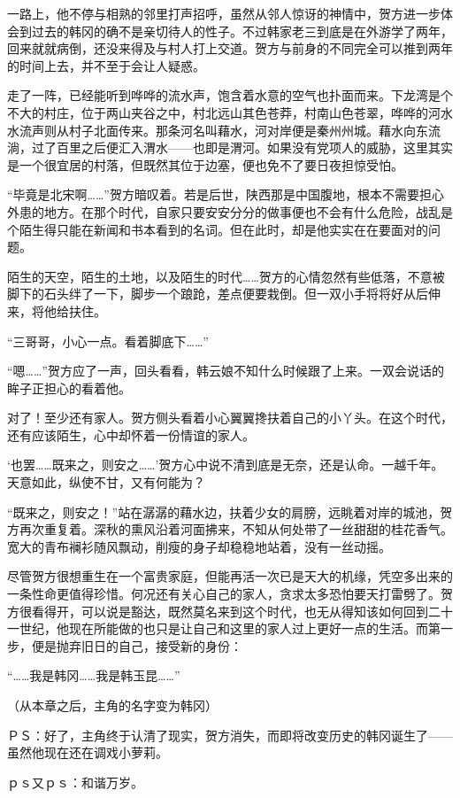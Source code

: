一路上，他不停与相熟的邻里打声招呼，虽然从邻人惊讶的神情中，贺方进一步体会到过去的韩冈的确不是亲切待人的性子。不过韩家老三到底是在外游学了两年，回来就就病倒，还没来得及与村人打上交道。贺方与前身的不同完全可以推到两年的时间上去，并不至于会让人疑惑。

走了一阵，已经能听到哗哗的流水声，饱含着水意的空气也扑面而来。下龙湾是个不大的村庄，位于两山夹谷之中，村北远山其色苍莽，村南山色苍翠，哗哗的河水水流声则从村子北面传来。那条河名叫藉水，河对岸便是秦州州城。藉水向东流淌，过了百里之后便汇入渭水——也即是渭河。如果没有党项人的威胁，这里其实是一个很宜居的村落，但既然其位于边塞，便也免不了要日夜担惊受怕。

“毕竟是北宋啊……”贺方暗叹着。若是后世，陕西那是中国腹地，根本不需要担心外患的地方。在那个时代，自家只要安安分分的做事便也不会有什么危险，战乱是个陌生得只能在新闻和书本看到的名词。但在此时，却是他实实在在要面对的问题。

陌生的天空，陌生的土地，以及陌生的时代……贺方的心情忽然有些低落，不意被脚下的石头绊了一下，脚步一个踉跄，差点便要栽倒。但一双小手将将好从后伸来，将他给扶住。

“三哥哥，小心一点。看着脚底下……”

“嗯……”贺方应了一声，回头看看，韩云娘不知什么时候跟了上来。一双会说话的眸子正担心的看着他。

对了！至少还有家人。贺方侧头看着小心翼翼搀扶着自己的小丫头。在这个时代，还有应该陌生，心中却怀着一份情谊的家人。

‘也罢……既来之，则安之……’贺方心中说不清到底是无奈，还是认命。一越千年。天意如此，纵使不甘，又有何能为？

“既来之，则安之！”站在潺潺的藉水边，扶着少女的肩膀，远眺着对岸的城池，贺方再次重复着。深秋的熏风沿着河面拂来，不知从何处带了一丝甜甜的桂花香气。宽大的青布襕衫随风飘动，削瘦的身子却稳稳地站着，没有一丝动摇。

尽管贺方很想重生在一个富贵家庭，但能再活一次已是天大的机缘，凭空多出来的一条性命更值得珍惜。何况还有关心自己的家人，贪求太多恐怕要天打雷劈了。贺方很看得开，可以说是豁达，既然莫名来到这个时代，也无从得知该如何回到二十一世纪，他现在所能做的也只是让自己和这里的家人过上更好一点的生活。而第一步，便是抛弃旧日的自己，接受新的身份：

“……我是韩冈……我是韩玉昆……”

（从本章之后，主角的名字变为韩冈）

ＰＳ：好了，主角终于认清了现实，贺方消失，而即将改变历史的韩冈诞生了——虽然他现在还在调戏小萝莉。

ｐｓ又ｐｓ：和谐万岁。


